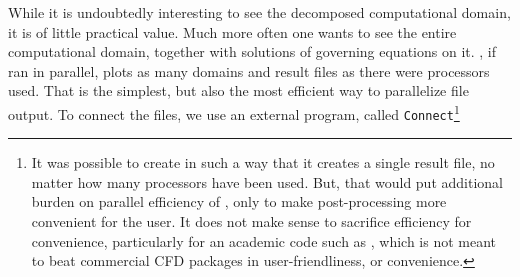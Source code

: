 While it is undoubtedly interesting to see the decomposed computational
domain, it is of little practical value. Much more often one wants to 
see the entire computational domain, together with solutions of governing
equations on it. {\psiboil}, if ran in parallel, plots as many domains
and result files as there were processors used. That is the simplest,
but also the most efficient way to parallelize file output. To connect
the files, we use an external program, called {\tt Connect}\footnote{It
was possible to create {\psiboil} in such a way that it creates a single
result file, no matter how many processors have been used. But, that would
put additional burden on parallel efficiency of {\psiboil}, only to make
post-processing more convenient for the user. It does not make sense to
sacrifice efficiency for convenience, particularly for an academic code
such as {\psiboil}, which is not meant to beat commercial CFD packages
in user-friendliness, or convenience.} 

